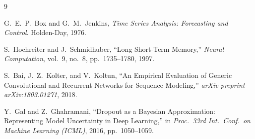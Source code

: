 \documentclass[12pt,a4paper]{report}
\begin{document}
\begin{thebibliography}{9}

G.\ E.\ P.\ Box and G.\ M.\ Jenkins,
\textit{Time Series Analysis: Forecasting and Control}.
Holden-Day, 1976.

S.\ Hochreiter and J.\ Schmidhuber,
``Long Short-Term Memory,''
\textit{Neural Computation}, vol.\ 9, no.\ 8, pp.\ 1735--1780, 1997.

S.\ Bai, J.\ Z.\ Kolter, and V.\ Koltun,
``An Empirical Evaluation of Generic Convolutional and Recurrent Networks for Sequence
Modeling,''
\textit{arXiv preprint arXiv:1803.01271}, 2018.

Y.\ Gal and Z.\ Ghahramani,
``Dropout as a Bayesian Approximation: Representing Model Uncertainty in Deep Learning,''
in \textit{Proc.\ 33rd Int.\ Conf.\ on Machine Learning (ICML)}, 2016, pp.\ 1050--1059.

\end{thebibliography}
\end{document}
